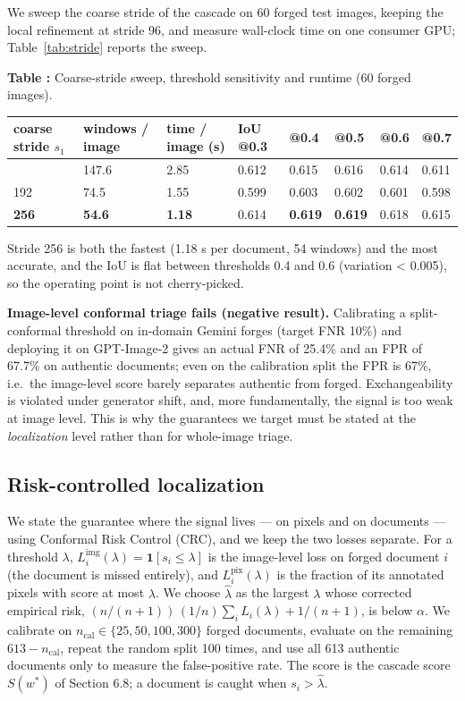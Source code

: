 \documentclass[preprint,12pt]{elsarticle}
\newcounter{tabno}
\newcommand{\tabcaption}[1]{\par\needspace{9\baselineskip}\refstepcounter{tabno}\noindent\textbf{Table \thetabno:} #1\par\vspace{2pt}}
\begin{document}
We sweep the coarse stride of the cascade on 60 forged test images, keeping the local refinement at stride 96, and measure wall-clock time on one consumer GPU; Table~\ref{tab:stride} reports the sweep.

{
\tabcaption{Coarse-stride sweep, threshold sensitivity and runtime (60 forged images).}\label{tab:stride}
\begin{longtable}[]{@{}llllllll@{}}
\toprule\noalign{}

coarse stride $s_1$
 & 
windows / image
 & 
time / image (s)
 & 
IoU @0.3
 & 
@0.4
 & 
@0.5
 & 
@0.6
 & 
@0.7
 \\
\midrule\noalign{}
\endhead
\bottomrule\noalign{}
\endlastfoot
128 & 147.6 & 2.85 & 0.612 & 0.615 & 0.616 & 0.614 & 0.611 \\
192 & 74.5 & 1.55 & 0.599 & 0.603 & 0.602 & 0.601 & 0.598 \\
\textbf{256} & \textbf{54.6} & \textbf{1.18} & 0.614 & \textbf{0.619} & \textbf{0.619} & 0.618 & 0.615 \\
\end{longtable}
}

Stride 256 is both the fastest (1.18 s per document, 54 windows) and the most accurate, and the IoU is flat between thresholds 0.4 and 0.6 (variation \textless{} 0.005), so the operating point is not cherry-picked.

\textbf{Image-level conformal triage fails (negative result).} Calibrating a split-conformal threshold on in-domain Gemini forges (target FNR 10\%) and deploying it on GPT-Image-2 gives an actual FNR of 25.4\% and an FPR of 67.7\% on authentic documents; even on the calibration split the FPR is 67\%, i.e.~the image-level score barely separates authentic from forged. Exchangeability is violated under generator shift, and, more fundamentally, the signal is too weak at image level. This is why the guarantees we target must be stated at the \emph{localization} level rather than for whole-image triage.

\subsection{Risk-controlled localization}\label{risk-controlled-localization}

We state the guarantee where the signal lives --- on pixels and on documents --- using Conformal Risk Control (CRC), and we keep the two losses separate. For a threshold $\lambda$, $L_i^{\mathrm{img}}(\lambda)=\mathbf{1}[s_i\le\lambda]$ is the image-level loss on forged document $i$ (the document is missed entirely), and $L_i^{\mathrm{pix}}(\lambda)$ is the fraction of its annotated pixels with score at most $\lambda$. We choose $\hat{\lambda}$ as the largest $\lambda$ whose corrected empirical risk, $(n/(n+1))\,(1/n)\sum_i L_i(\lambda)+1/(n+1)$, is below $\alpha$. We calibrate on $n_{\mathrm{cal}}\in\{25,50,100,300\}$ forged documents, evaluate on the remaining $613-n_{\mathrm{cal}}$, repeat the random split 100 times, and use all 613 authentic documents only to measure the false-positive rate. The score is the cascade score $S(w^*)$ of Section 6.8; a document is caught when $s_i>\hat{\lambda}$.
\end{document}
